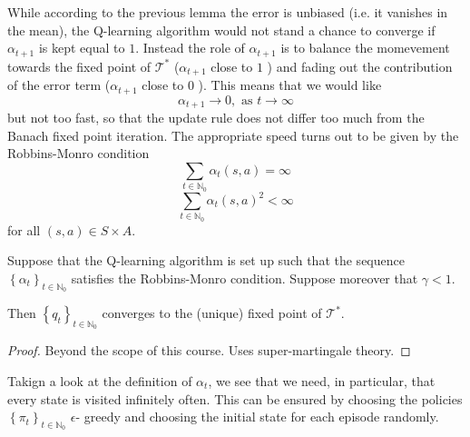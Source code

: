 While according to the previous lemma the error is unbiased (i.e. it vanishes in the mean), the Q-learning algorithm would not stand a chance to converge if \( \alpha_{t+1} \) is kept equal to \( 1 \).
Instead the role of \( \alpha_{t+1} \) is to balance the momevement towards the fixed point of \( \mathcal{T}^* \) (\( \alpha_{t+1} \) close to \( 1 \)  ) and fading out the contribution of the error term (\( \alpha_{t+1} \) close to \( 0 \)  ). This means that we would like 
\[
    \alpha_{t+1} \to 0, \text{ as } t \to \infty
\]
but not too fast, so that the update rule does not differ too much from the Banach fixed point iteration. The appropriate speed turns out to be given by the Robbins-Monro condition 
\[
    \sum_{t \in \mathbb{N}_{0}} \alpha_t (s,a) = \infty
\]
\[
     \sum_{t \in \mathbb{N}_{0}} \alpha_t (s,a)^2 < \infty
\]
for all \( (s,a) \in S \times A \).




\begin{theorem}
Suppose that the Q-learning algorithm is set up such that the sequence \( \left\{  \alpha_t \right\}_{t \in \mathbb{N}_{0}} \) satisfies the Robbins-Monro condition. Suppose moreover that \( \gamma < 1 \).

Then \( \left\{ q_t \right\}_{t \in \mathbb{N}_{0}} \) converges to the (unique) fixed point of \( \mathcal{T}^* \).
\end{theorem}

\begin{proof}Beyond the scope of this course. Uses super-martingale theory.
\end{proof}



Takign a look at the definition of \( \alpha_t \), we see that we need, in particular, that every state is visited infinitely often. This can be ensured by choosing the policies \( \left\{ \pi_t \right\}_{t \in \mathbb{N}_{0}}\) \( \epsilon \)- greedy and choosing the initial state for each episode randomly.











